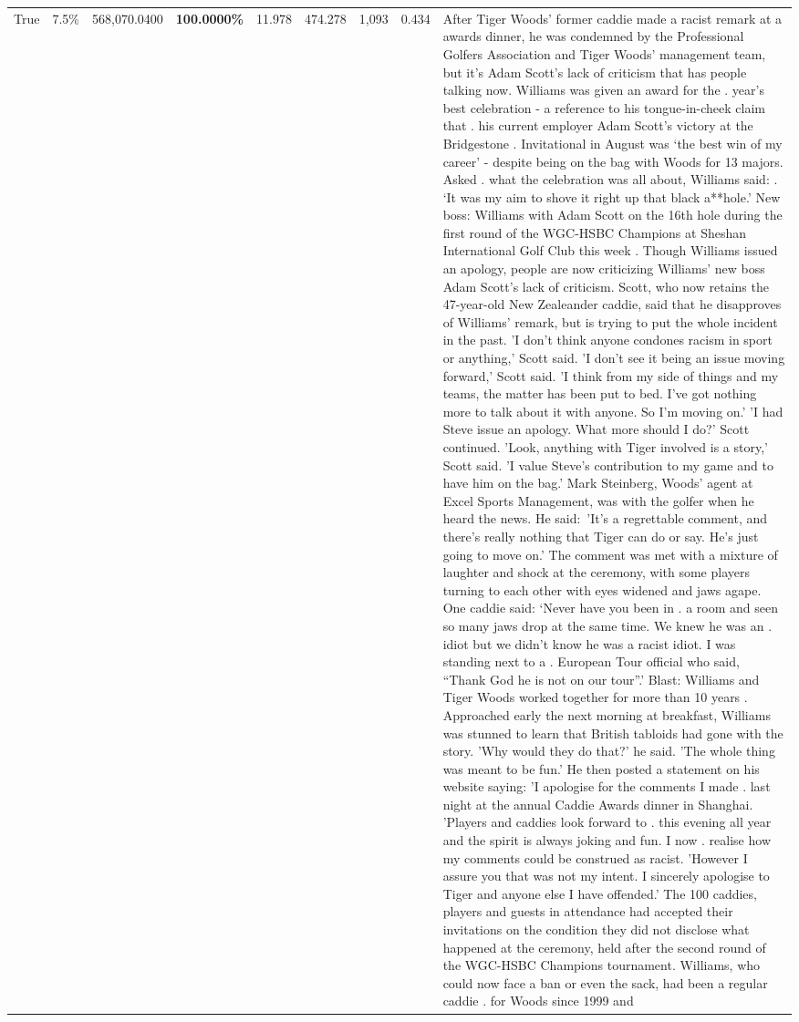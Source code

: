 \begin{table}[H]
\begin{tabular}{lllrlllll}
True & 7.5\% & 568,070.0400 & \bfseries \color{red} 100.0000\% & 11.978 & 474.278 & 1,093 & 0.434 & After Tiger Woods' former caddie made a racist remark at a awards dinner, he was condemned by the Professional Golfers Association and Tiger Woods' management team, but it's Adam Scott's lack of criticism that has people talking now. Williams was given an award for the . year’s best celebration - a reference to his tongue-in-cheek claim that . his current employer Adam Scott’s victory at the Bridgestone . Invitational in August was ‘the best win of my career’ - despite being on the bag with Woods for 13 majors. Asked . what the celebration was all about, Williams said: . ‘It was my aim to shove it right up that black a**hole.’ New boss: Williams with Adam Scott  on the 16th hole during the first round of the WGC-HSBC Champions at Sheshan International Golf Club this week . Though Williams issued an apology, people are now criticizing Williams' new boss Adam Scott's lack of criticism. Scott, who now retains the 47-year-old New Zealeander caddie, said that he disapproves of Williams' remark, but is trying to put the whole incident in the past. 'I don't think anyone condones racism in sport or anything,' Scott said. 'I don't see it being an issue moving forward,' Scott said. 'I think from my side of things and my teams, the matter has been put to bed. I've got nothing more to talk about it with anyone. So I'm moving on.' 'I had Steve issue an apology. What more should I do?' Scott continued. 'Look, anything with Tiger involved is a story,' Scott said. 'I value Steve's contribution to my game and to have him on the bag.' Mark Steinberg, Woods' agent at Excel Sports Management, was with the golfer when he heard the news. He said: 'It's a regrettable comment, and there's really nothing that Tiger can do or say. He's just going to move on.' The comment was met with a mixture of laughter and shock at the ceremony, with some players turning to each other with eyes widened and jaws agape. One caddie said: ‘Never have you been in . a room and seen so many jaws drop at the same time. We knew he was an . idiot but we didn’t know he was a racist idiot. I was standing next to a . European Tour official who said, “Thank God he is not on our tour”.’ Blast: Williams and Tiger Woods worked together for more than 10 years . Approached early the next morning at breakfast, Williams was stunned to learn that British tabloids had gone with the story. 'Why would they do that?' he said. 'The whole thing was meant to be fun.' He then posted a statement on his website saying: 'I apologise for the comments I made . last night at the annual Caddie Awards dinner in Shanghai. 'Players and caddies look forward to . this evening all year and the spirit is always joking and fun. I now . realise how my comments could be construed as racist. 'However I assure you that was not my intent. I sincerely apologise to Tiger and anyone else I have offended.' The 100 caddies, players and guests in attendance had accepted their invitations on the condition they did not disclose what happened at the ceremony, held after the second round of the WGC-HSBC Champions tournament. Williams, who could now face a ban or even the sack, had been a regular caddie . for Woods since 1999 and 
\end{tabular}
\end{table}
